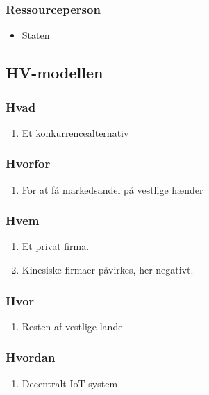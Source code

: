 \documentclass[11pt]{article}
\begin{document}
\subsubsection{Ressourceperson}
\label{sec:org63a3f15}
\begin{itemize}
\item Staten
\end{itemize}
\subsection{HV-modellen}
\label{sec:org6b97fc3}
\subsubsection{Hvad}
\label{sec:orgbaa59e1}
\begin{enumerate}
\item Et konkurrencealternativ
\end{enumerate}
\subsubsection{Hvorfor}
\label{sec:orgda4cb7c}
\begin{enumerate}
\item For at få markedsandel på vestlige hænder
\end{enumerate}
\subsubsection{Hvem}
\label{sec:org4e76554}
\begin{enumerate}
\item Et privat firma.
\item Kinesiske firmaer påvirkes, her negativt.
\end{enumerate}
\subsubsection{Hvor}
\label{sec:org442bab2}
\begin{enumerate}
\item Resten af vestlige lande.
\end{enumerate}
\subsubsection{Hvordan}
\label{sec:org66417d5}
\begin{enumerate}
\item Decentralt IoT-system
\end{enumerate}
\end{document}
